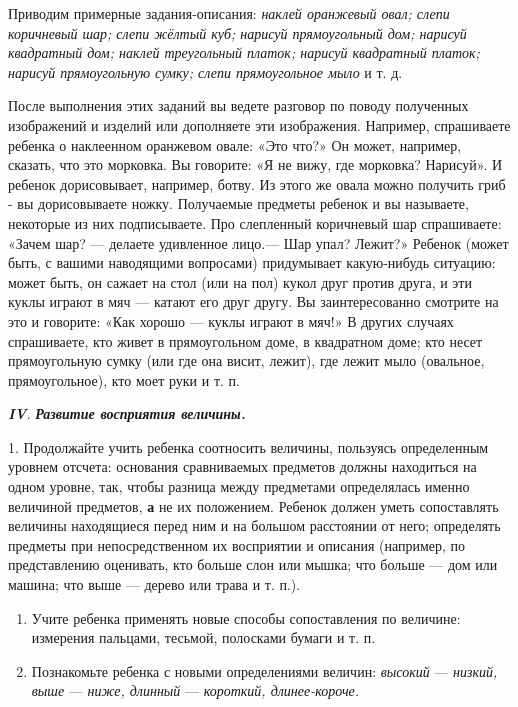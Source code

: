 \documentclass{book}
\renewcommand{\emph}[1]{\textit{#1}}
\begin{document}
Приводим примерные задания-описания: \emph{наклей оранжевый овал; слепи
коричневый шар; слепи жёлтый куб; нарисуй прямоугольный дом; нарисуй
квадратный дом; наклей треугольный платок; нарисуй квадратный платок;
нарисуй прямоугольную сумку; слепи прямоугольное мыло} и т. д.

После выполнения этих заданий вы ведете разговор по поводу полученных
изображений и изделий или дополняете эти изображения. Например,
спрашиваете ребенка о наклеенном оранжевом овале: «Это что?» Он может,
например, сказать, что это морковка. Вы говорите: «Я не вижу, где
морковка? Нарисуй». И ребенок дорисовывает, например, ботву. Из этого же
овала можно получить гриб - вы дорисовываете ножку. Получаемые предметы
ребенок и вы называете, некоторые из них подписываете. Про слепленный
коричневый шар спрашиваете: «Зачем шар? --- делаете удивленное лицо.---
Шар упал? Лежит?» Ребенок (может быть, с вашими наводящими вопросами)
придумывает какую-нибудь ситуацию: может быть, он сажает на стол (или на
пол) кукол друг против друга, и эти куклы играют в мяч --- катают его
друг другу. Вы заинтересованно смотрите на это и говорите: «Как хорошо
--- куклы играют в мяч!» В других случаях спрашиваете, кто живет в
прямоугольном доме, в квадратном доме; кто несет прямоугольную сумку
(или где она висит, лежит), где лежит мыло (овальное, прямоугольное),
кто моет руки и т. п.

\emph{\textbf{IV}}. \emph{\textbf{Развитие восприятия величины.}}

1. Продолжайте учить ребенка соотносить величины, пользуясь определенным
уровнем отсчета: основания сравниваемых предметов должны находиться на
одном уровне, так, чтобы разница между предметами определялась именно
величиной предметов, \textbf{а} не их положением. Ребенок должен уметь
сопоставлять величины находящиеся перед ним и на большом расстоянии от
него; определять предметы при непосредственном их восприятии и описания
(например, по представлению оценивать, кто больше слон или мышка; что
больше --- дом или машина; что выше --- дерево или трава и т. п.).


\begin{enumerate}
\def\labelenumi{\arabic{enumi}.}
\setcounter{enumi}{1}
\item
  
  Учите ребенка применять новые способы сопоставления по величине:
  измерения пальцами, тесьмой, полосками бумаги и т. п.
  
\item
  
  Познакомьте ребенка с новыми определениями величин: \emph{высокий} ---
  \emph{низкий, выше} --- \emph{ниже, длинный} --- \emph{короткий,
  длинее-короче.}
  
\end{enumerate}
\end{document}
